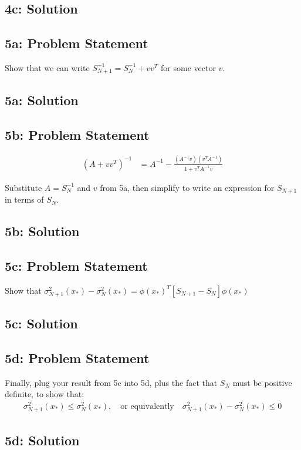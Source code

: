 \documentclass[12pt]{article}
\newcommand{\officialdirections}[1]{{\color{blue} #1}}
\begin{document}
\subsection{4c: Solution}



\newpage
\officialdirections{
\subsection*{5a: Problem Statement}
Show that we can write $S_{N+1}^{-1} = S_N^{-1} + vv^T$ for some vector $v$.
}

\subsection{5a: Solution}




\newpage
\officialdirections{
\subsection*{5b: Problem Statement}
\begin{align}
(A + vv^T)^{-1} &= A^{-1} - \frac{ (A^{-1}v)(v^T A^{-1})}{ 1 + v^T A^{-1} v}
\end{align}

Substitute $A = S_N^{-1}$ and $v$ from 5a, then simplify to write an expression for $S_{N+1}$ in terms of $S_{N}$.
}

\subsection{5b: Solution}



\officialdirections{
\subsection*{5c: Problem Statement}
Show that $\sigma^2_{N+1}(x_*) - \sigma^2_{N}(x_*) = \phi(x_*)^T \left[ S_{N+1} - S_{N} \right] \phi(x_*)$ 

}

\subsection{5c: Solution}


\newpage
\officialdirections{
\subsection*{5d: Problem Statement}
Finally, plug your result from 5c into 5d, plus the fact that $S_N$ must be positive definite, to show that:
\begin{align}
\sigma_{N+1}^2(x_*) \leq \sigma_N^2(x_*), \quad \text{or equivalently} \quad \sigma_{N+1}^2(x_*) - \sigma_N^2(x_*) \leq 0
\end{align}
}

\subsection{5d: Solution}
\end{document}
